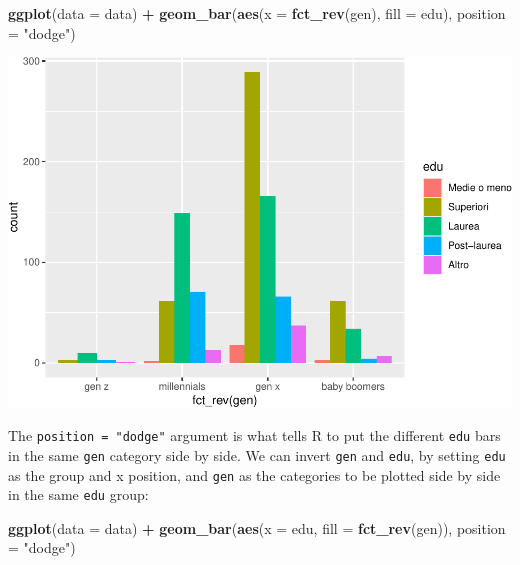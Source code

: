\documentclass[
]{book}
\newenvironment{Shaded}{\begin{snugshade}}{\end{snugshade}}
\newcommand{\AttributeTok}[1]{\textcolor[rgb]{0.13,0.29,0.53}{#1}}
\newcommand{\FunctionTok}[1]{\textcolor[rgb]{0.13,0.29,0.53}{\textbf{#1}}}
\newcommand{\NormalTok}[1]{#1}
\newcommand{\SpecialCharTok}[1]{\textcolor[rgb]{0.81,0.36,0.00}{\textbf{#1}}}
\newcommand{\StringTok}[1]{\textcolor[rgb]{0.31,0.60,0.02}{#1}}
\begin{document}
\begin{Shaded}
\begin{Highlighting}[]
\FunctionTok{ggplot}\NormalTok{(}\AttributeTok{data =}\NormalTok{ data) }\SpecialCharTok{+}
  \FunctionTok{geom\_bar}\NormalTok{(}\FunctionTok{aes}\NormalTok{(}\AttributeTok{x =} \FunctionTok{fct\_rev}\NormalTok{(gen), }\AttributeTok{fill =}\NormalTok{ edu), }\AttributeTok{position =} \StringTok{"dodge"}\NormalTok{)}
\end{Highlighting}
\end{Shaded}

\includegraphics{R-for-social-research-and-business-analytics_files/figure-latex/unnamed-chunk-37-1.pdf}

The \texttt{position\ =\ "dodge"} argument is what tells R to put the different \texttt{edu} bars in the same \texttt{gen} category side by side. We can invert \texttt{gen} and \texttt{edu}, by setting \texttt{edu} as the group and x position, and \texttt{gen} as the categories to be plotted side by side in the same \texttt{edu} group:

\begin{Shaded}
\begin{Highlighting}[]
\FunctionTok{ggplot}\NormalTok{(}\AttributeTok{data =}\NormalTok{ data) }\SpecialCharTok{+}
  \FunctionTok{geom\_bar}\NormalTok{(}\FunctionTok{aes}\NormalTok{(}\AttributeTok{x =}\NormalTok{ edu, }\AttributeTok{fill =} \FunctionTok{fct\_rev}\NormalTok{(gen)), }\AttributeTok{position =} \StringTok{"dodge"}\NormalTok{)}
\end{Highlighting}
\end{Shaded}
\end{document}
